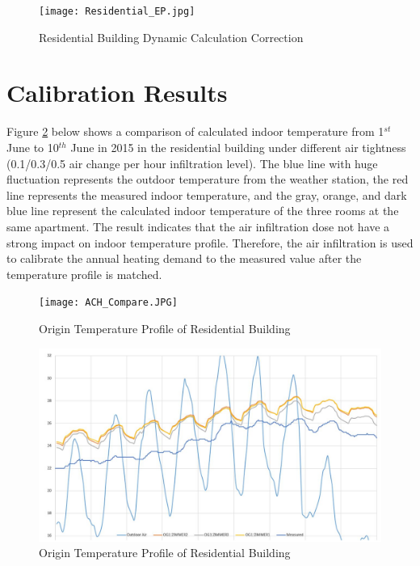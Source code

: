 		\begin{figure}[htbp]
		\centering
		\texttt{[image: Residential\_EP.jpg]}
		\caption{Residential Building Dynamic Calculation Correction}
		\label{fig:Hongger_EP}
		\end{figure}
		
		




	\section{Calibration Results}

			Figure \ref{fig:ACH_Compare} below shows a comparison of calculated indoor temperature from 1$^{st}$ June to 10$^{th}$ June in 2015 in the residential building under different air tightness (0.1/0.3/0.5 air change per hour infiltration level). The blue line with huge fluctuation represents the outdoor temperature from the weather station, the red line represents the measured indoor temperature, and the gray, orange, and dark blue line represent the calculated indoor temperature of the three rooms at the same apartment. The result indicates that the air infiltration dose not have a strong impact on indoor temperature profile. Therefore, the air infiltration is used to calibrate the annual heating demand to the measured value after the temperature profile is matched.\\
		
			\begin{figure}[H]
			\centering
			\texttt{[image: ACH\_Compare.JPG]}
			\caption{Origin Temperature Profile of Residential Building}
			\label{fig:ACH_Compare}
			\end{figure}

			\begin{figure}[H]
			\centering
			\includegraphics[scale=0.4]{Figure/Hongg_Clibration_Origin.JPG}
			\caption{Origin Temperature Profile of Residential Building}
			\label{fig:HonggCalibrationOrigin}
			\end{figure}
			
